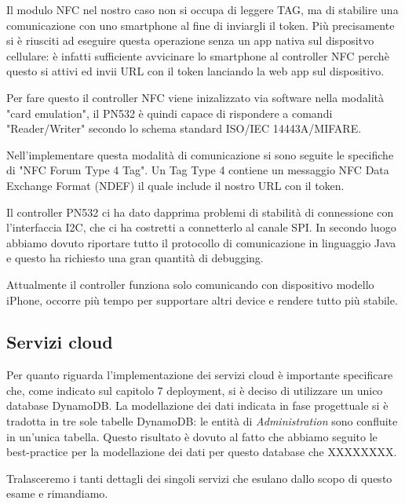 Il modulo NFC nel nostro caso non si occupa di leggere TAG, ma di stabilire una comunicazione con uno smartphone al fine di inviargli il token.
Più precisamente si è riusciti ad eseguire questa operazione senza un app nativa sul dispositvo cellulare: 
è infatti sufficiente avvicinare lo smartphone al controller NFC perchè questo si attivi ed invii URL con il token lanciando la web app sul dispositivo.

Per fare questo il controller NFC viene inizalizzato via software nella modalità "card emulation", il PN532 è quindi capace di rispondere a comandi "Reader/Writer" 
secondo lo schema standard ISO/IEC 14443A/MIFARE.

Nell'implementare questa modalità di comunicazione si sono seguite le specifiche di "NFC Forum Type 4 Tag".
Un Tag Type 4 contiene un messaggio NFC Data Exchange Format (NDEF) il quale include il nostro URL con il token.

Il controller PN532 ci ha dato dapprima problemi di stabilità di connessione con l'interfaccia I2C, che ci ha costretti a connetterlo al canale SPI.
In secondo luogo abbiamo dovuto riportare tutto il protocollo di comunicazione in linguaggio Java e questo ha richiesto una gran quantità di debugging.

Attualmente il controller funziona solo comunicando con dispositivo modello iPhone, occorre più tempo per supportare altri device e rendere tutto più stabile. 

\subsection{Servizi cloud}
Per quanto riguarda l'implementazione dei servizi cloud è importante specificare che, come indicato sul capitolo 7 deployment, si è deciso di utilizzare un unico database DynamoDB.
La modellazione dei dati indicata in fase progettuale si è tradotta in tre sole tabelle DynamoDB: le entità di \textit{Administration} sono confluite in un'unica tabella.
Questo risultato è dovuto al fatto che abbiamo seguito le best-practice per la modellazione dei dati per questo database che 
XXXXXXXX.

Tralasceremo i tanti dettagli dei singoli servizi che esulano dallo scopo di questo esame e rimandiamo. 
\newpage